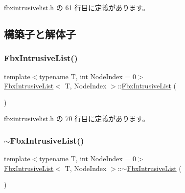  fbxintrusivelist.\+h の 61 行目に定義があります。



\subsection{構築子と解体子}
\mbox{\label{class_fbx_intrusive_list_a438d0989f5ff6755cd58bec5e85ddaac}} 
\subsubsection{\texorpdfstring{Fbx\+Intrusive\+List()}{FbxIntrusiveList()}}
{\footnotesize\ttfamily template$<$typename T, int Node\+Index = 0$>$ \\
\hyperlink{class_fbx_intrusive_list}{Fbx\+Intrusive\+List}$<$ T, Node\+Index $>$\+::\hyperlink{class_fbx_intrusive_list}{Fbx\+Intrusive\+List} (\begin{DoxyParamCaption}{ }\end{DoxyParamCaption})\hspace{0.3cm}{\ttfamily [inline]}}



 fbxintrusivelist.\+h の 70 行目に定義があります。

\mbox{\label{class_fbx_intrusive_list_a4528bf939398fb9281478a8faf75891a}} 
\subsubsection{\texorpdfstring{$\sim$\+Fbx\+Intrusive\+List()}{~FbxIntrusiveList()}}
{\footnotesize\ttfamily template$<$typename T, int Node\+Index = 0$>$ \\
\hyperlink{class_fbx_intrusive_list}{Fbx\+Intrusive\+List}$<$ T, Node\+Index $>$\+::$\sim$\hyperlink{class_fbx_intrusive_list}{Fbx\+Intrusive\+List} (\begin{DoxyParamCaption}{ }\end{DoxyParamCaption})\hspace{0.3cm}{\ttfamily [inline]}}



